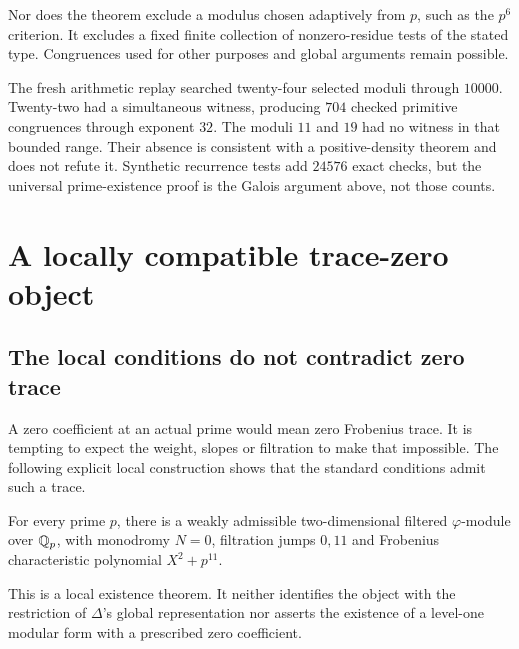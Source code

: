 Nor does the theorem exclude a modulus chosen adaptively from $p$, such as the $p^6$ criterion. It excludes a fixed finite collection of nonzero-residue tests of the stated type. Congruences used for other purposes and global arguments remain possible.

The fresh arithmetic replay searched twenty-four selected moduli through $10000$. Twenty-two had a simultaneous witness, producing $704$ checked primitive congruences through exponent $32$. The moduli $11$ and $19$ had no witness in that bounded range. Their absence is consistent with a positive-density theorem and does not refute it. Synthetic recurrence tests add $24576$ exact checks, but the universal prime-existence proof is the Galois argument above, not those counts.


\chapter{A locally compatible trace-zero object}\label{ch:local}
\section{The local conditions do not contradict zero trace}
A zero coefficient at an actual prime would mean zero Frobenius trace. It is tempting to expect the weight, slopes or filtration to make that impossible. The following explicit local construction shows that the standard conditions admit such a trace.

\begin{theorem}\label{thm:localphi}
For every prime $p$, there is a weakly admissible two-dimensional filtered $\varphi$-module over $\mathbb Q_p$, with monodromy $N=0$, filtration jumps $0,11$ and Frobenius characteristic polynomial $X^2+p^{11}$.
\end{theorem}

This is a local existence theorem. It neither identifies the object with the restriction of $\Delta$'s global representation nor asserts the existence of a level-one modular form with a prescribed zero coefficient.

